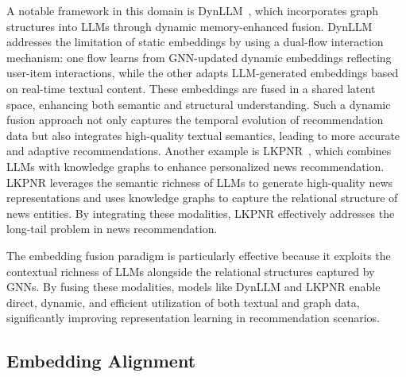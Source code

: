 
A notable framework in this domain is DynLLM~\cite{zhao2024dynllm}, which incorporates graph structures into LLMs through dynamic memory-enhanced fusion. DynLLM addresses the limitation of static embeddings by using a dual-flow interaction mechanism: one flow learns from GNN-updated dynamic embeddings reflecting user-item interactions, while the other adapts LLM-generated embeddings based on real-time textual content. These embeddings are fused in a shared latent space, enhancing both semantic and structural understanding. Such a dynamic fusion approach not only captures the temporal evolution of recommendation data but also integrates high-quality textual semantics, leading to more accurate and adaptive recommendations. Another example is LKPNR~\cite{runfeng2023lkpnr}, which combines LLMs with knowledge graphs to enhance personalized news recommendation. LKPNR leverages the semantic richness of LLMs to generate high-quality news representations and uses knowledge graphs to capture the relational structure of news entities. By integrating these modalities, LKPNR effectively addresses the long-tail problem in news recommendation.

The embedding fusion paradigm is particularly effective because it exploits the contextual richness of LLMs alongside the relational structures captured by GNNs. By fusing these modalities, models like DynLLM and LKPNR enable direct, dynamic, and efficient utilization of both textual and graph data, significantly improving representation learning in recommendation scenarios.

\subsection{Embedding Alignment}

